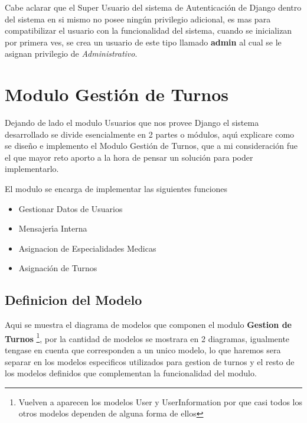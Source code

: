 Cabe aclarar que el Super Usuario del sistema de Autenticaci\'on de Django dentro 
del sistema en si mismo no posee ning\'un privilegio adicional, es mas para 
compatibilizar el usuario con la funcionalidad del sistema, cuando se inicializan
por primera ves, se crea un usuario de este tipo llamado \textbf{admin} al cual
se le asignan privilegio de \textit{Administrativo}.



\section{Modulo Gesti\'on de Turnos}

Dejando de lado el modulo Usuarios que nos provee Django el sistema desarrollado 
se divide esencialmente en 2 partes o m\'odulos, aqu\'{\i} explicare como se dise\~no e
implemento el Modulo Gesti\'on de Turnos, que a mi consideraci\'on fue el que mayor
reto aporto a la hora de pensar un soluci\'on para poder implementarlo.

El modulo se encarga de implementar las siguientes funciones

\begin{itemize}
    \item Gestionar Datos de Usuarios
    \item Mensajer\'{\i}a Interna
    \item Asignacion de Especialidades Medicas
    \item Asignaci\'on de Turnos
\end{itemize}



\subsection{Definicion del Modelo}

Aqui se muestra el diagrama de modelos que componen el modulo \textbf{Gestion 
de Turnos} \footnote{Vuelven a aparecen los modelos User y UserInformation por 
que casi todos los otros modelos dependen de alguna forma de ellos}, por la 
cantidad de modelos se mostrara en 2 diagramas, igualmente tengase en cuenta
que corresponden a un unico modelo, lo que haremos sera separar en los modelos
especificos utilizados para gestion de turnos y el resto de los modelos 
definidos que complementan la funcionalidad del modulo.


